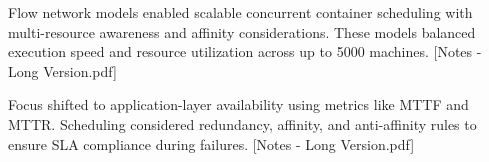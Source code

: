 \begin{multicols}{2}
Flow network models enabled scalable concurrent container scheduling with multi-resource awareness and affinity considerations. These models balanced execution speed and resource utilization across up to 5000 machines. [Notes - Long Version.pdf]


Focus shifted to application-layer availability using metrics like MTTF and MTTR. Scheduling considered redundancy, affinity, and anti-affinity rules to ensure SLA compliance during failures. [Notes - Long Version.pdf]

\end{multicols}


